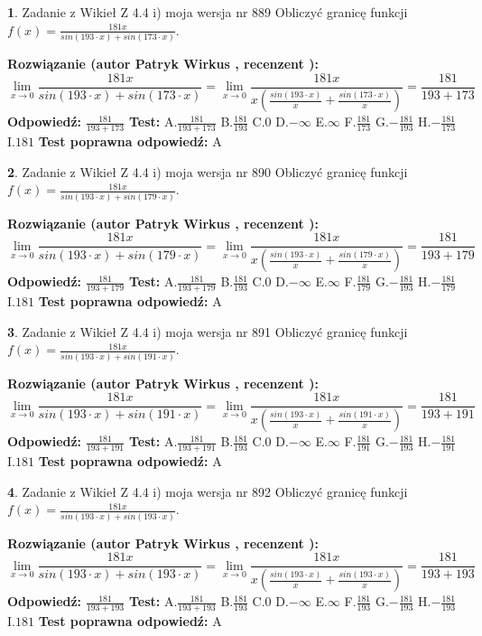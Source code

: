 \documentclass[12pt, a4paper]{article}
\theoremstyle{definition} %
\newtheorem{zad}{}
\newcommand{\zadStart}[1]{\begin{zad}#1\newline}
\newcommand{\zadStop}{\end{zad}}
\newcommand{\rozwStart}[2]{\noindent \textbf{Rozwiązanie (autor #1 , recenzent #2): }\newline}
\newcommand{\rozwStop}{\newline}
\newcommand{\odpStart}{\noindent \textbf{Odpowiedź:}\newline}
\newcommand{\odpStop}{\newline}
\newcommand{\testStart}{\noindent \textbf{Test:}\newline}
\newcommand{\testStop}{\newline}
\newcommand{\kluczStart}{\noindent \textbf{Test poprawna odpowiedź:}\newline}
\newcommand{\kluczStop}{\newline}
\begin{document}
\zadStart{Zadanie z Wikieł Z 4.4 i) moja wersja nr 889}
Obliczyć granicę funkcji $f(x)=\frac{181x}{sin(193\cdot x) +sin(173\cdot x)}$.
\zadStop
\rozwStart{Patryk Wirkus}{}
$$\lim\limits_{x\to 0}\frac{181x}{sin(193\cdot x) +sin(173\cdot x)}=\lim\limits_{x\to 0}\frac{181x}{x(\frac{sin(193\cdot x)}{x}+\frac{sin(173\cdot x)}{x})}=\frac{181}{193+173}$$
\rozwStop
\odpStart
$\frac{181}{193+173}$
\odpStop
\testStart
A.$\frac{181}{193+173}$
B.$\frac{181}{193}$
C.$0$
D.$-\infty$
E.$\infty$
F.$\frac{181}{173}$
G.$-\frac{181}{193}$
H.$-\frac{181}{173}$
I.$181$
\testStop
\kluczStart
A
\kluczStop



\zadStart{Zadanie z Wikieł Z 4.4 i) moja wersja nr 890}
Obliczyć granicę funkcji $f(x)=\frac{181x}{sin(193\cdot x) +sin(179\cdot x)}$.
\zadStop
\rozwStart{Patryk Wirkus}{}
$$\lim\limits_{x\to 0}\frac{181x}{sin(193\cdot x) +sin(179\cdot x)}=\lim\limits_{x\to 0}\frac{181x}{x(\frac{sin(193\cdot x)}{x}+\frac{sin(179\cdot x)}{x})}=\frac{181}{193+179}$$
\rozwStop
\odpStart
$\frac{181}{193+179}$
\odpStop
\testStart
A.$\frac{181}{193+179}$
B.$\frac{181}{193}$
C.$0$
D.$-\infty$
E.$\infty$
F.$\frac{181}{179}$
G.$-\frac{181}{193}$
H.$-\frac{181}{179}$
I.$181$
\testStop
\kluczStart
A
\kluczStop



\zadStart{Zadanie z Wikieł Z 4.4 i) moja wersja nr 891}
Obliczyć granicę funkcji $f(x)=\frac{181x}{sin(193\cdot x) +sin(191\cdot x)}$.
\zadStop
\rozwStart{Patryk Wirkus}{}
$$\lim\limits_{x\to 0}\frac{181x}{sin(193\cdot x) +sin(191\cdot x)}=\lim\limits_{x\to 0}\frac{181x}{x(\frac{sin(193\cdot x)}{x}+\frac{sin(191\cdot x)}{x})}=\frac{181}{193+191}$$
\rozwStop
\odpStart
$\frac{181}{193+191}$
\odpStop
\testStart
A.$\frac{181}{193+191}$
B.$\frac{181}{193}$
C.$0$
D.$-\infty$
E.$\infty$
F.$\frac{181}{191}$
G.$-\frac{181}{193}$
H.$-\frac{181}{191}$
I.$181$
\testStop
\kluczStart
A
\kluczStop



\zadStart{Zadanie z Wikieł Z 4.4 i) moja wersja nr 892}
Obliczyć granicę funkcji $f(x)=\frac{181x}{sin(193\cdot x) +sin(193\cdot x)}$.
\zadStop
\rozwStart{Patryk Wirkus}{}
$$\lim\limits_{x\to 0}\frac{181x}{sin(193\cdot x) +sin(193\cdot x)}=\lim\limits_{x\to 0}\frac{181x}{x(\frac{sin(193\cdot x)}{x}+\frac{sin(193\cdot x)}{x})}=\frac{181}{193+193}$$
\rozwStop
\odpStart
$\frac{181}{193+193}$
\odpStop
\testStart
A.$\frac{181}{193+193}$
B.$\frac{181}{193}$
C.$0$
D.$-\infty$
E.$\infty$
F.$\frac{181}{193}$
G.$-\frac{181}{193}$
H.$-\frac{181}{193}$
I.$181$
\testStop
\kluczStart
A
\kluczStop
\end{document}
